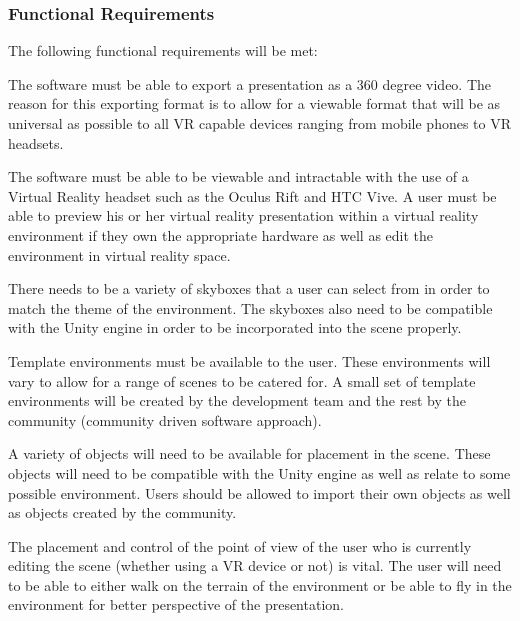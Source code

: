 \begin{flushleft}
	\subsubsection{Functional Requirements}

	The following functional requirements will be met:


		The software must be able to export a presentation as a 360 degree video.
		The reason for this exporting format is to allow for a viewable format that will be as universal as possible to all VR capable devices ranging from mobile phones to VR headsets.


		The software must be able to be viewable and intractable with the use of a Virtual Reality headset such as the Oculus Rift and HTC Vive.
		A user must be able to preview his or her virtual reality presentation within a virtual reality environment if they own the appropriate hardware as well as edit the environment in virtual reality space.


		There needs to be a variety of skyboxes that a user can select from in order to match the theme of the environment.
		The skyboxes also need to be compatible with the Unity engine in order to be incorporated into the scene properly.


		Template environments must be available to the user.
		These environments will vary to allow for a range of scenes to be catered for.
		A small set of template environments will be created by the development team and the rest by the community (community driven software approach).


		A variety of objects will need to be available for placement in the scene.
		These objects will need to be compatible with the Unity engine as well as relate to some possible environment.
	  Users should be allowed to import their own objects as well as objects created by the community.


		The placement and control of the point of view of the user who is currently editing the scene (whether using a VR device or not) is vital.
		The user will need to be able to either walk on the terrain of the environment or be able to fly in the environment for better perspective of the presentation.


\end{flushleft}
